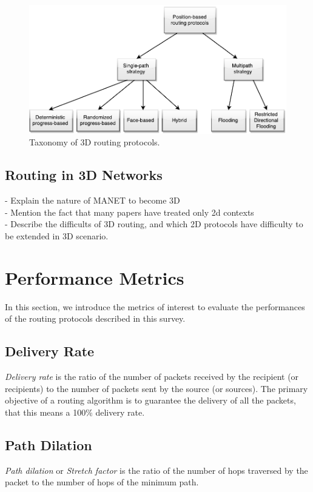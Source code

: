 \documentclass[journal,comsoc]{IEEEtran}
\begin{document}
\begin{figure}[!t]
\centering
\includegraphics[width=5in]{taxonomy}
\caption{Taxonomy of 3D routing protocols.}
\label{fig:taxonomy}
\end{figure}

\subsection{Routing in 3D Networks}
- Explain the nature of MANET to become 3D\\
- Mention the fact that many papers have treated only 2d contexts\\
- Describe the difficults of 3D routing, and which 2D protocols have difficulty to be extended in 3D scenario.\\

\section{Performance Metrics}
In this section, we introduce the metrics of interest to evaluate the performances of the routing protocols described in this survey.

\subsection{Delivery Rate}
\textit{Delivery rate} is the ratio of the number of packets received by the recipient (or recipients) to the number of packets sent by the source (or sources). The primary objective of a routing algorithm is to guarantee the delivery of all the packets, that this means a 100\% delivery rate.
\subsection{Path Dilation}
\textit{Path dilation} or \textit{Stretch factor} is the ratio of the number of hops traversed by the packet to the number of hops of the minimum path.
\end{document}
